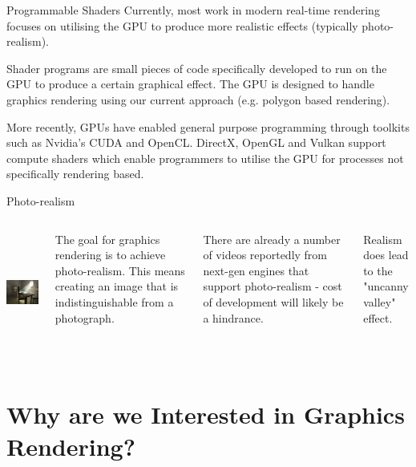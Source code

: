 \documentclass[handout,18pt]{beamer}
\begin{document}
\begin{frame}{Programmable Shaders}
\pause
Currently, most work in modern real-time rendering focuses on utilising the GPU to produce more realistic effects (typically photo-realism).
\pause

\vspace{11pt}
Shader programs are small pieces of code specifically developed to run on the GPU to produce a certain graphical effect.  The GPU is designed to handle graphics rendering using our current approach (e.g. polygon based rendering).
\pause

\vspace{11pt}
More recently, GPUs have enabled general purpose programming through toolkits such as Nvidia's CUDA and OpenCL.  DirectX, OpenGL and Vulkan support compute shaders which enable programmers to utilise the GPU for processes not specifically rendering based.
\end{frame}

\begin{frame}{Photo-realism}
\begin{columns}
\includegraphics[height=4cm]{photorealism.jpg}

\vspace{15pt}
The goal for graphics rendering is to achieve photo-realism.  This means creating an image that is indistinguishable from a photograph.

\vspace{11pt}
There are already a number of videos reportedly from next-gen engines that support photo-realism - cost of development will likely be a hindrance.

\vspace{11pt}
Realism does lead to the "uncanny valley" effect.
\end{columns}
\end{frame}

\section{Why are we Interested in Graphics Rendering?}
\end{document}
